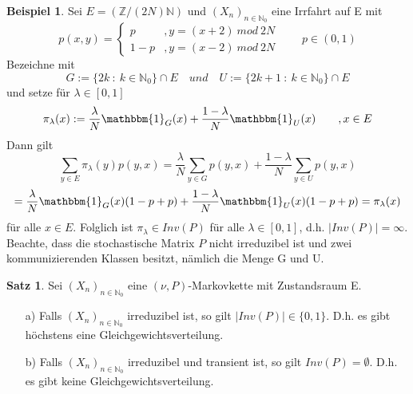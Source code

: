 \documentclass[a4paper,12pt]{scrartcl}
\theoremstyle{definition}
\newtheorem{sat}{Satz}[section]
\newtheorem{bsp}{Beispiel}[section]
\begin{document}
\begin{bsp}
Sei $E= (\mathbb{Z} / (2N)\mathbb{N})$ und $(X_{n})_{n \in \mathbb{N}_{0}}$ eine Irrfahrt auf E mit
\begin{equation*}
p(x,y)=
\begin{cases}
p & , y = (x+2) \: mod \: 2N  \\
1-p & , y = (x-2) \: mod \: 2N 
\end{cases} 
\qquad p \in (0,1)
\end{equation*}
Bezeichne mit
\begin{equation*}
G := \lbrace 2k \: : \: k \in \mathbb{N}_{0} \rbrace \cap E \quad und \quad U := \lbrace 2k +1 \: : \: k \in \mathbb{N}_{0} \rbrace \cap E
\end{equation*}
und setze für $\lambda \in [0,1]$
\begin{equation*}
\pi_{\lambda}(x) := \dfrac{\lambda}{N}\mathbbm{1}_{G}(x) + \dfrac{1-\lambda}{N}\mathbbm{1}_{U}(x) \qquad, x \in E
\end{equation*}
Dann gilt
\begin{equation*}
\sum_{y \in E} \pi_{\lambda}(y)p(y,x) = \dfrac{\lambda}{N} \sum_{y \in G} p(y,x) + \dfrac{1-\lambda}{N} \sum_{y \in U} p(y,x)
\end{equation*}
\begin{equation*}
= \dfrac{\lambda}{N}\mathbbm{1}_{G}(x)(1-p+p) + \dfrac{1-\lambda}{N}\mathbbm{1}_{U}(x)(1-p+p) = \pi_{\lambda}(x)
\end{equation*}
für alle $x \in E$. Folglich ist $\pi_{\lambda} \in Inv(P)$ für alle $\lambda \in [0,1]$, d.h. $\vert Inv(P) \vert = \infty$. Beachte, dass die stochastische Matrix $P$ nicht irreduzibel ist und zwei kommunizierenden Klassen besitzt, nämlich die Menge G und U.
\end{bsp}
\begin{sat}
\label{höchstens eine Gleichverteilung}
Sei $(X_{n})_{n \in \mathbb{N}_{0}}$ eine $(\nu,P)$-Markovkette mit Zustandsraum E.
\begin{itemize}
\item[a)] Falls $(X_{n})_{n \in \mathbb{N}_{0}}$  irreduzibel ist, so gilt $\vert Inv(P) \vert \in \lbrace 0,1 \rbrace$. D.h. es gibt höchstens eine Gleichgewichtsverteilung.
\item[b)] Falls $(X_{n})_{n \in \mathbb{N}_{0}}$ irreduzibel und transient ist, so gilt $Inv(P) = \emptyset$. D.h. es gibt keine Gleichgewichtsverteilung.  
\end{itemize}
\end{sat}
\end{document}
